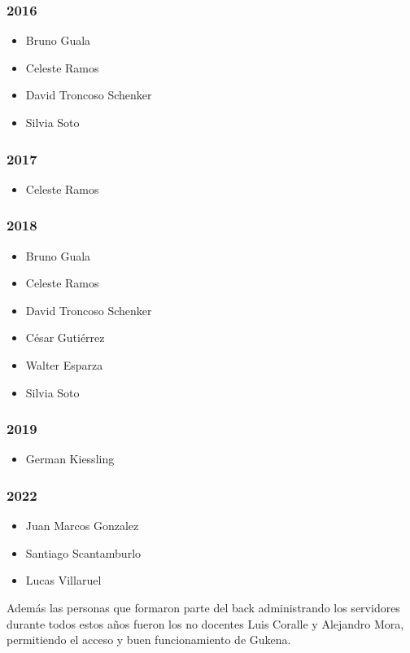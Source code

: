 \subsubsection{2016}
\begin{itemize}
    \item Bruno Guala
    \item Celeste Ramos
    \item David Troncoso Schenker
    \item Silvia Soto
\end{itemize}
\subsubsection{2017}
\begin{itemize}
    \item Celeste Ramos
\end{itemize}
\subsubsection{2018}
\begin{itemize}
    \item Bruno Guala
    \item Celeste Ramos
    \item David Troncoso Schenker
    \item César Gutiérrez 
    \item Walter Esparza 
    \item Silvia Soto
\end{itemize}
\subsubsection{2019}
\begin{itemize}
    \item German Kiessling
\end{itemize}
\subsubsection{2022}
\begin{itemize}
    \item Juan Marcos Gonzalez
    \item Santiago Scantamburlo
    \item Lucas Villaruel
\end{itemize}
Además las personas que formaron parte del back administrando los servidores durante todos estos años fueron los no docentes Luis Coralle y Alejandro Mora, permitiendo el acceso y buen funcionamiento de Gukena.



